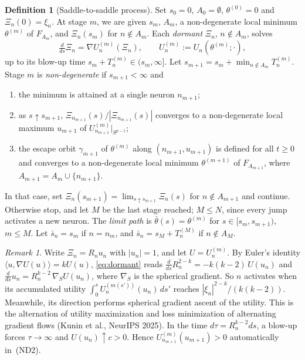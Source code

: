 \documentclass[11pt]{article}
\theoremstyle{definition}
\newtheorem{definition}{Definition}
\theoremstyle{remark}
\newtheorem*{remark}{Remark}
\newcommand{\ip}[2]{\langle #1,#2\rangle}
\newcommand{\ND}[1]{\textup{(ND#1)}}
\begin{document}
\begin{definition}[Saddle-to-saddle process]\label{def:process}
Set $s_0=0$, $A_0=\emptyset$, $\theta^{(0)}=0$ and $\Xi_n(0)=\xi_n$. At stage $m$, we are given $s_m$, $A_m$, a non-degenerate local minimum $\theta^{(m)}$ of $F_{A_m}$, and $\Xi_n(s_m)$ for $n\notin A_m$. Each \emph{dormant} $\Xi_n$, $n\notin A_m$, solves
\begin{equation}\label{eq:dormant}
\tfrac{d}{ds}\Xi_n=\nabla U^{(m)}_n(\Xi_n),\qquad U^{(m)}_n:=U_n(\theta^{(m)};\cdot),
\end{equation}
up to its blow-up time $s_m+T^{(m)}_n\in(s_m,\infty]$. Let $s_{m+1}=s_m+\min_{n\notin A_m}T^{(m)}_n$. Stage $m$ is \emph{non-degenerate} if $s_{m+1}<\infty$ and
\begin{enumerate}[label=\textup{(ND\arabic*)},leftmargin=4em,nosep]
\item the minimum is attained at a single neuron $n_{m+1}$;
\item as $s\uparrow s_{m+1}$, $\Xi_{n_{m+1}}(s)/|\Xi_{n_{m+1}}(s)|$ converges to a non-degenerate local maximum $u_{m+1}$ of $U^{(m)}_{n_{m+1}}|_{S^{p-1}}$;
\item the escape orbit $\gamma_{m+1}$ of $\theta^{(m)}$ along $(n_{m+1},u_{m+1})$ is defined for all $t\ge0$ and converges to a non-degenerate local minimum $\theta^{(m+1)}$ of $F_{A_{m+1}}$, where $A_{m+1}=A_m\cup\{n_{m+1}\}$.
\end{enumerate}
In that case, set $\Xi_n(s_{m+1})=\lim_{s\uparrow s_{m+1}}\Xi_n(s)$ for $n\notin A_{m+1}$ and continue. Otherwise stop, and let $M$ be the last stage reached; $M\le N$, since every jump activates a new neuron. The \emph{limit path} is $\bar\theta(s)=\theta^{(m)}$ for $s\in[s_m,s_{m+1})$, $m\le M$. Let $\bar s_n=s_m$ if $n=n_m$, and $\bar s_n=s_M+T^{(M)}_n$ if $n\notin A_M$.
\end{definition}

\begin{remark}
Write $\Xi_n=R_nu_n$ with $|u_n|=1$, and let $U=U^{(m)}_n$. By Euler's identity $\ip{u}{\nabla U(u)}=kU(u)$, \eqref{eq:dormant} reads $\frac{d}{ds}R_n^{2-k}=-k(k-2)\,U(u_n)$ and $\frac{d}{ds}u_n=R_n^{k-2}\,\nabla_{S}U(u_n)$, where $\nabla_S$ is the spherical gradient. So $n$ activates when its accumulated utility $\int_0^sU^{(m(s'))}_n(u_n)\,ds'$ reaches $|\xi_n|^{2-k}/(k(k-2))$. Meanwhile, its direction performs spherical gradient ascent of the utility. This is the alternation of utility maximization and loss minimization of alternating gradient flows (Kunin et al., NeurIPS 2025). In the time $d\tau=R_n^{k-2}ds$, a blow-up forces $\tau\to\infty$ and $U(u_n)\uparrow c>0$. Hence $U^{(m)}_{n_{m+1}}(u_{m+1})>0$ automatically in~\ND2.
\end{remark}
\end{document}
